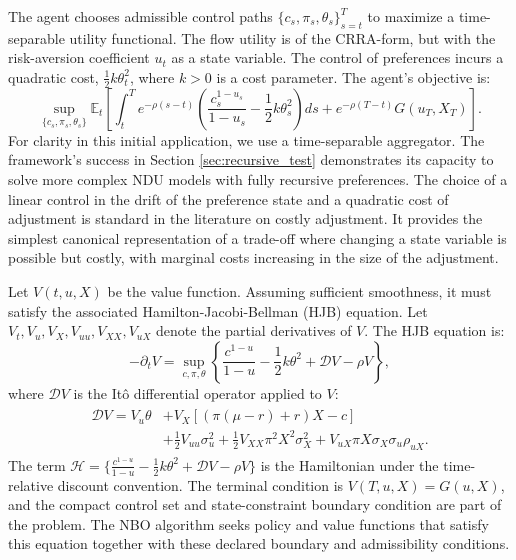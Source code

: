 \documentclass[ecta]{econsocart}
\theoremstyle{plain}
\theoremstyle{remark}
\newcommand{\E}{\mathbb{E}}
\begin{document}
The agent chooses admissible control paths $\{c_s, \pi_s, \theta_s\}_{s=t}^T$ to maximize a time-separable utility functional. The flow utility is of the CRRA-form, but with the risk-aversion coefficient $u_t$ as a state variable. The control of preferences incurs a quadratic cost, $\frac{1}{2}k\theta_t^2$, where $k>0$ is a cost parameter. The agent's objective is:
\begin{equation}
\sup_{\{c_s, \pi_s, \theta_s\}} \E_t\left[\int_t^T e^{-\rho(s-t)}\left(\frac{c_s^{1-u_s}}{1-u_s}-\frac12 k\theta_s^2\right)ds+e^{-\rho(T-t)}G(u_T,X_T)\right].
\end{equation}
For clarity in this initial application, we use a time-separable aggregator. The framework's success in Section \ref{sec:recursive_test} demonstrates its capacity to solve more complex NDU models with fully recursive preferences. The choice of a linear control in the drift of the preference state and a quadratic cost of adjustment is standard in the literature on costly adjustment. It provides the simplest canonical representation of a trade-off where changing a state variable is possible but costly, with marginal costs increasing in the size of the adjustment.

Let $V(t, u, X)$ be the value function. Assuming sufficient smoothness, it must satisfy the associated Hamilton-Jacobi-Bellman (HJB) equation. Let $V_t, V_u, V_X, V_{uu}, V_{XX}, V_{uX}$ denote the partial derivatives of $V$. The HJB equation is:
\begin{equation} \label{eq:ndu_hjb}
-\partial_t V = \sup_{c, \pi, \theta} \left\{ \frac{c^{1-u}}{1-u} - \frac{1}{2}k\theta^2 + \mathcal{D}V - \rho V \right\},
\end{equation}
where $\mathcal{D}V$ is the Itô differential operator applied to $V$:
\begin{align}
\begin{split}
\mathcal{D}V = V_u \theta &+ V_X \left[ (\pi(\mu-r) + r)X - c \right] \\
&+ \frac{1}{2}V_{uu}\sigma_u^2 + \frac{1}{2}V_{XX}\pi^2 X^2 \sigma_X^2 + V_{uX} \pi X \sigma_X \sigma_u \rho_{uX}.
\end{split}
\end{align}
The term $\mathcal{H} = \{ \frac{c^{1-u}}{1-u} - \frac{1}{2}k\theta^2 + \mathcal{D}V - \rho V \}$ is the Hamiltonian under the time-relative discount convention. The terminal condition is $V(T,u,X)=G(u,X)$, and the compact control set and state-constraint boundary condition are part of the problem. The NBO algorithm seeks policy and value functions that satisfy this equation together with these declared boundary and admissibility conditions.
\end{document}
